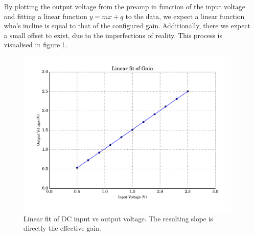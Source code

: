 By  plotting  the output voltage from the preamp  in  function  of  the  input
voltage and fitting a linear function $y=mx+q$ to the data, we expect a linear
function who's  incline is equal to that of the configured gain. Additionally,
there  we expect a small offset to exist, due to the imperfections of reality.
This  process  is  visualised  in  figure \ref{fig:linear_fit}.

\begin{figure}
    \centering
    \includegraphics[width=.7\linewidth]{images/plots/linear_fit.pdf}
    \caption{Linear fit of DC input vs output voltage. The resulting slope is directly the effective gain.}
    \label{fig:linear_fit}
\end{figure}

